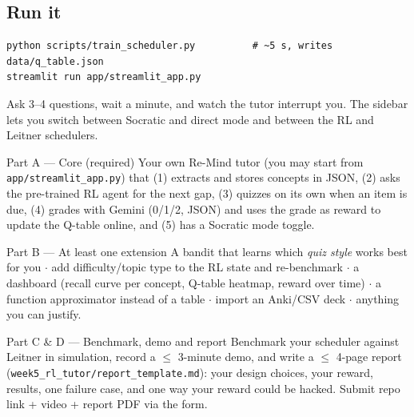 \subsection{Run it}
\begin{lstlisting}[style=shell]
python scripts/train_scheduler.py          # ~5 s, writes data/q_table.json
streamlit run app/streamlit_app.py
\end{lstlisting}
Ask 3--4 questions, wait a minute, and watch the tutor interrupt you. The sidebar lets you switch between Socratic
and direct mode and between the RL and Leitner schedulers.

\begin{task}{Part A --- Core (required)}
Your own Re-Mind tutor (you may start from \texttt{app/streamlit\_app.py}) that (1) extracts and stores concepts in JSON,
(2) asks the pre-trained RL agent for the next gap, (3) quizzes on its own when an item is due, (4) grades with Gemini
(0/1/2, JSON) and uses the grade as reward to update the Q-table online, and (5) has a Socratic mode toggle.
\end{task}
\begin{task}{Part B --- At least one extension}
A bandit that learns which \emph{quiz style} works best for you $\cdot$ add difficulty/topic type to the RL state and
re-benchmark $\cdot$ a dashboard (recall curve per concept, Q-table heatmap, reward over time) $\cdot$ a function
approximator instead of a table $\cdot$ import an Anki/CSV deck $\cdot$ anything you can justify.
\end{task}
\begin{task}{Part C \& D --- Benchmark, demo and report}
Benchmark your scheduler against Leitner in simulation, record a $\le$ 3-minute demo, and write a $\le$ 4-page report
(\texttt{week5\_rl\_tutor/report\_template.md}): your design choices, your reward, results, one failure case, and one way
your reward could be hacked. Submit repo link + video + report PDF via the form.
\end{task}

